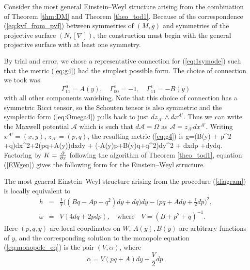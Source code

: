 Consider the most general Einstein--Weyl structure arising from the combination
of Theorem \ref{thm:DM} and Theorem \ref{theo_tod1}. Because of the correspondence (\ref{eq:kvf_from_pvf}) between symmetries of $(M, g)$ and symmetries of the projective surface $(N, [\nabla])$, the construction must begin with the general projective surface with at least one symmetry. 
 
By trial and error, we chose a representative connection for (\ref{eq:1symode}) such that the metric (\ref{eq:g4}) had the simplest possible form. The choice of connection we took was
\[
\Gamma^{0}_{11}=A(y),\quad \Gamma^{1}_{00}=-1, \quad \Gamma^{1}_{11}=-B(y)
\]
with all other components vanishing. Note that this choice of connection has a symmetric Ricci tensor, so the Schouten tensor is also symmetric and the symplectic form (\ref{eq:Omega4}) pulls back to just $dz_{A'}\wedge dx^{A'}$. Thus we can write the Maxwell potential $\mathcal{A}$ which is such that $d\mathcal{A}=\Omega$ as $\mathcal{A}=z_{A'}dx^{A'}$. Writing $x^{A'}=(x,y)$, $z_{A'}=(p,q)$, the resulting metric (\ref{eq:g4}) is
\be
\label{einstein_1}
g=(B(y) + p^2 +q)dx^2+2(pq+A(y))dxdy + (-A(y)p+B(y)q+q^2)dy^2 + dxdp +dydq.
\ee
Factoring by $K=\frac{\partial}{\partial x}$ following the algorithm of Theorem
\ref{theo_tod1}, equation (\ref{EWgen}) gives the following form for the Einstein--Weyl structure.
\begin{prop}
\label{prop1}
The most general  Einstein--Weyl structure arising
from the procedure (\ref{diagram}) is locally equivalent to
\begin{eqnarray}
\label{ew_final}
h&=&\frac{1}{V}\big((Bq -Ap+ q^2)dy+dq\big)dy
-\Big({pq+A}dy+\frac{1}{2}dp\Big)^2, \label{genh} \\
\omega&=&V(4dq+2 pdp), \quad\mbox{where}\quad V=
({B}+ p^2+q)^{-1}.\nonumber
\end{eqnarray}
Here $(p, q, y)$ are local coordinates on $W$, $A(y), B(y)$ are arbitrary functions of $y$, and the corresponding solution to the monopole equation (\ref{eq:monopole_eq}) is the pair $(V,\alpha)$, where
\[
\alpha=V( pq+A)dy+\frac{V}{2}dp.
\]
\end{prop}


